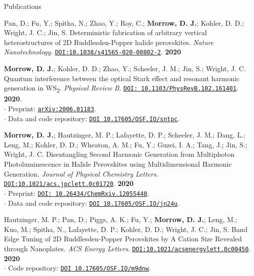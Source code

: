 \documentclass{resume} %
\begin{document}
\begin{rSection}{Publications}
\begin{etaremune}
\item  Pan, D.; Fu, Y.; Spitha, N.; Zhao, Y.; Roy, C.; \textbf{Morrow, D. J.};  Kohler, D. D.;  Wright, J. C.; Jin, S. Deterministic fabrication of arbitrary vertical heterostructures of 2D Ruddlesden-Popper halide perovskites.  \emph{Nature Nanotechnology}. \href{https://doi.org/10.1038/s41565-020-00802-2}{\texttt{DOI:10.1038/s41565-020-00802-2}}. \textbf{2020}

\item \textbf{Morrow, D. J.}; Kohler, D. D.; Zhao, Y.; Scheeler, J. M.; Jin, S.; Wright, J. C.	Quantum interference between the optical Stark effect and resonant harmonic generation in WS\textsubscript{2}.  \emph{Physical Review B}. \href{https://journals.aps.org/prb/abstract/10.1103/PhysRevB.102.161401}{\texttt{DOI: 10.1103/PhysRevB.102.161401}}. \textbf{2020}.\\
$\cdot$ Preprint: \href{http://arxiv.org/abs/2006.01183}{\texttt{arXiv:2006.01183}}. \\
$\cdot$ Data and code repository: \href{https://osf.io/sntpc/}{\texttt{DOI 10.17605/OSF.IO/sntpc}}.

\item \textbf{Morrow, D. J.}; Hautzinger, M. P.; Lafayette, D. P.; Scheeler, J. M.; Dang, L.; Leng, M.; Kohler, D. D.; Wheaton, A. M.; Fu, Y.; Guzei, I. A.; Tang, J.; Jin, S.; Wright, J. C. Disentangling Second Harmonic Generation from Multiphoton Photoluminescence in Halide Perovskites using Multidimensional Harmonic Generation. \emph{Journal of Physical Chemistry Letters}. \href{https://pubs.acs.org/doi/10.1021/acs.jpclett.0c01720}{\texttt{DOI:10.1021/acs.jpclett.0c01720}}. \textbf{2020} \\
$\cdot$ Preprint: \href{https://dx.doi.org/10.26434/chemrxiv.12055440}{\texttt{DOI: 10.26434/ChemRxiv.12055440}}. \\
$\cdot$ Data and code repository: \href{https://osf.io/jn24u/}{\texttt{DOI 10.17605/OSF.IO/jn24u}}.

\item Hautzinger, M. P.; Pan, D.; Piggs, A. K.; Fu, Y.; \textbf{Morrow, D. J.}; Leng, M.; Kuo, M.; Spitha, N., Lafayette, D. P.; Kohler, D. D.; Wright, J. C.; Jin, S. Band Edge Tuning of 2D Ruddlesden-Popper Perovskites by A Cation Size Revealed through Nanoplates. \emph{ACS Energy Letters}. \href{https://pubs.acs.org/doi/10.1021/acsenergylett.0c00450}{\texttt{DOI:10.1021/acsenergylett.0c00450}}. \textbf{2020} \\
$\cdot$ Code repository: \href{https://osf.io/m9dnw/}{\texttt{DOI 10.17605/OSF.IO/m9dnw}}.


\end{etaremune}
\end{rSection}
\end{document}
